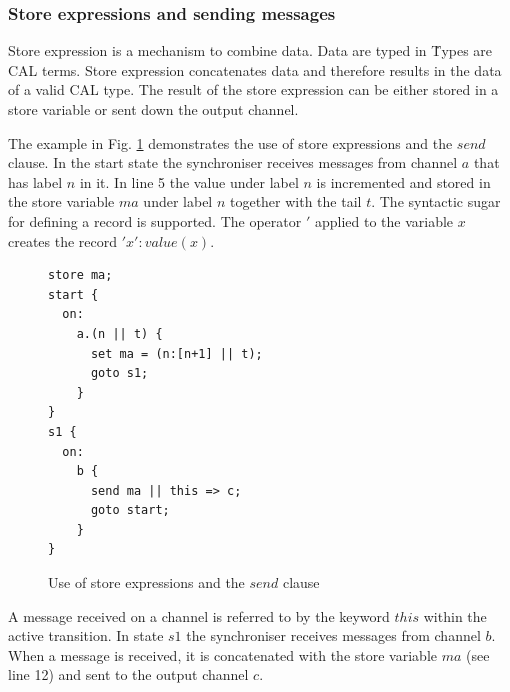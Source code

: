  \subsubsection{Store expressions and sending messages}
Store expression is a mechanism to combine data. Data are typed in \ak\. Types are CAL terms. Store expression concatenates data and therefore results in the data of a valid CAL type. The result of the store expression can be either stored in a store variable or sent down the output channel.

The example in Fig. \ref{sync_send} demonstrates the use of store expressions and the $send$ clause. In the start state the synchroniser receives messages from channel $a$ that has label $n$ in it. In line 5 the value under label $n$ is incremented and stored in the store variable $ma$ under label $n$ together with the tail $t$. The syntactic sugar for defining a record is supported. The operator $'$ applied to the variable $x$ creates the record $'x': value(x)$.

\begin{figure}[h!]
\lstset{numbers=left, numberstyle=\small, stepnumber=1, numbersep=8pt}
\begin{lstlisting}[frame=single]
store ma;
start {
  on:
    a.(n || t) {
      set ma = (n:[n+1] || t);
      goto s1;
    }
}
s1 {
  on:
    b {
      send ma || this => c;
      goto start;
    }
}
\end{lstlisting}
\caption{Use of store expressions and the $send$ clause}
\label{sync_send}
\end{figure}

A message received on a channel is referred to by the keyword $this$ within the active transition. In state $s1$ the synchroniser receives messages from channel $b$. When a message is received, it is concatenated with the store variable $ma$ (see line 12) and sent to the output channel $c$.



